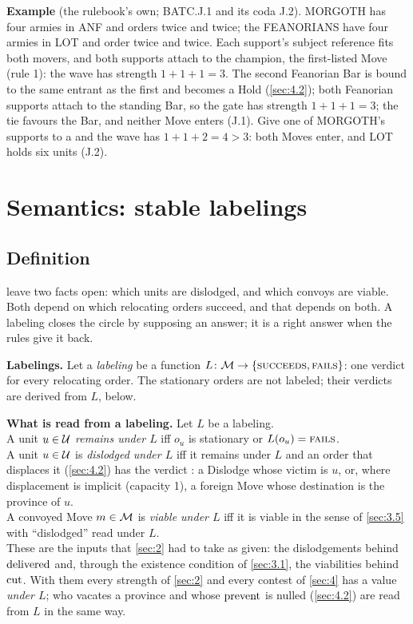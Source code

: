 \documentclass[12pt,a4paper]{article}
\begin{document}
\textbf{Example} (the rulebook's own; BATC.J.1 and its coda J.2).
MORGOTH has four armies in ANF and orders  twice and  twice; the FEANORIANS have four armies in LOT and order  twice and  twice.
Each support's subject reference fits both movers, and both supports attach to the champion, the first-listed Move (rule 1): the wave has strength $1 + 1 + 1 = 3$.
The second Feanorian Bar is bound to the same entrant as the first and becomes a Hold (\cref{sec:4.2}); both Feanorian supports attach to the standing Bar, so the gate has strength $1 + 1 + 1 = 3$; the tie favours the Bar, and neither Move enters (J.1).
Give one of MORGOTH's supports to a  and the wave has $1 + 1 + 2 = 4 > 3$: both Moves enter, and LOT holds six units (J.2).

\section{Semantics: stable labelings}\label{sec:5}

\subsection{Definition}\label{sec:5.1}

 leave two facts open: which units are dislodged, and which convoys are viable.
Both depend on which relocating orders succeed, and that depends on both.
A labeling closes the circle by supposing an answer; it is a right answer when the rules give it back.

\textbf{Labelings.}
Let a \emph{labeling} be a function $L\colon \mathcal{M} \to \{\textsc{succeeds}, \textsc{fails}\}$: one verdict for every relocating order.
The stationary orders are not labeled; their verdicts are derived from $L$, below.

\textbf{What is read from a labeling.}
Let $L$ be a labeling.\\
A unit $u \in \mathcal{U}$ \emph{remains under $L$} iff $o_u$ is stationary or $L(o_u) = \textsc{fails}$.\\
A unit $u \in \mathcal{U}$ is \emph{dislodged under $L$} iff it remains under $L$ and an order that displaces it (\cref{sec:4.2}) has the verdict : a Dislodge whose victim is $u$, or, where displacement is implicit (capacity 1), a foreign Move whose destination is the province of $u$.\\
A convoyed Move $m \in \mathcal{M}$ is \emph{viable under $L$} iff it is viable in the sense of \cref{sec:3.5} with ``dislodged'' read under $L$.\\
These are the inputs that \cref{sec:2} had to take as given: the dislodgements behind $\operatorname{delivered}$ and, through the existence condition of \cref{sec:3.1}, the viabilities behind $\operatorname{cut}$.
With them every strength of \cref{sec:2} and every contest of \cref{sec:4} has a value \emph{under $L$}; who vacates a province and whose $\operatorname{prevent}$ is nulled (\cref{sec:4.2}) are read from $L$ in the same way.
\end{document}
